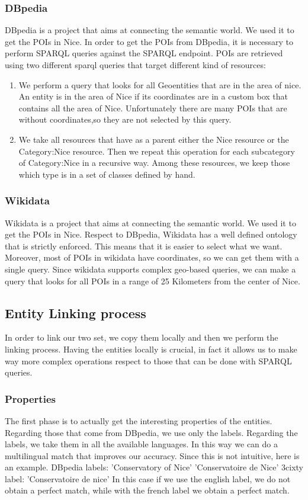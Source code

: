 \documentclass[paper=a4, fontsize=11pt]{scrartcl}
\begin{document}
\subsubsection{DBpedia}
DBpedia is a project that aims at connecting the semantic world. We used it to get the POIs in Nice.
In order to get the POIs from DBpedia, it is necessary to perform SPARQL queries against the SPARQL endpoint. POIs are retrieved using two different sparql queries that target different kind of resources:
\begin{enumerate}
\item We perform a query that looks for all Geoentities that are in the area of nice. An entity is in the area of Nice if its coordinates are in a custom box that contains all the area of Nice.
Unfortunately there are many POIs that are without coordinates,so they are not selected by this query.
\item We take all resources that have as a parent either the Nice resource or the Category:Nice resource. Then we repeat this operation for each subcategory of Category:Nice in a recursive way. Among these resources, we keep those which type is in a set of classes defined by hand.
\end{enumerate}
\subsubsection{Wikidata}
Wikidata is a project that aims at connecting the semantic world. We used it to get the POIs in Nice. Respect to DBpedia, Wikidata has a well defined ontology that is strictly enforced. This means that it is easier to select what we want. Moreover, most of POIs in wikidata have coordinates, so we can get them with a single query. Since wikidata supports complex geo-based queries, we can make a query that looks for all POIs in a range of 25 Kilometers from the center of Nice.
\subsection{Entity Linking process}
In order to link our two set, we copy them locally and then we perform the linking process. Having the entities locally is crucial, in fact it allows us to make way more complex operations respect to those that can be done with SPARQL queries.
\subsubsection{Properties}
The first phase is to actually get the interesting properties of the entities. Regarding those that come from DBpedia, we use only the labels. Regarding the labels, we take them in all the available languages. In this way we can do a multilingual match that improves our accuracy. Since this is not intuitive, here is an example.
DBpedia labels:
'Conservatory of Nice'
'Conservatoire de Nice'
3cixty label: 'Conservatoire de nice'
In this case if we use the english label, we do not obtain a perfect match, while with the french label we obtain a perfect match.
\end{document}
